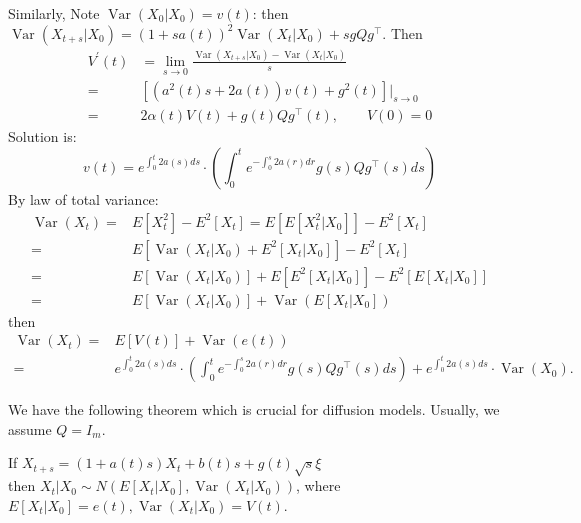 Similarly, Note $\operatorname{Var}\left(X_{0} | X_{0}\right)=v(t)$:
then $\operatorname{Var}\left(X_{t+s} | X_{0}\right)=(1+s a(t))^{2} \operatorname{Var}\left(X_{t} | X_{0}\right)+s gQg^\top$. Then
\begin{equation}
    \begin{aligned}
        V^{\prime}(t)&=\lim _{s \rightarrow 0} \frac{\operatorname{Var}\left(X_{t+s} | X_{0}\right)-\operatorname{Var}\left(X_{t} | X_{0}\right)}{s}\\
        =&\left[\left(a^{2}(t) s+2 a(t)\right) v(t)+g^{2}(t)\right]|_{s \rightarrow 0}\\ 
        =&2 \alpha(t) V(t)+g(t)Qg^\top(t), \qquad V(0)=0
    \end{aligned}
\end{equation}
Solution is:
\begin{equation}
    v(t)=e^{\int_{0}^{t} 2a(s) d s}\cdot\left(\int_{0}^{t} e^{-\int_{0}^{s} 2 a(r) d r} g(s)Qg^\top(s) d s\right)
\end{equation} 
By law of total variance:
\begin{equation}
    \begin{aligned}
        \operatorname{Var}\left(X_{t}\right)=&E\left[X_{t}^{2}\right]-E^{2}\left[X_{t}\right]=E\left[ E\left[X_{t}^{2} | X_{0}\right]\right]-E^{2}\left[X_{t}\right] \\
        =&E\left[\operatorname{Var}\left(X_{t} | X_{0}\right)+E^{2}\left[X_{t} | X_{0}\right]\right]-E^{2}\left[X_{t}\right] \\
        =&E\left[\operatorname{Var}\left(X_{t} | X_{0}\right)\right]+E\left[E^{2}\left[X_{t} | X_0\right]\right]-E^{2}\left[E\left[X_{t} | X_{0}\right]\right]\\
        =&E\left[\operatorname{Var}\left(X_{t} | X_{0}\right)\right]+\operatorname{Var}\left(E\left[X_{t} | X_0\right]\right)
    \end{aligned}
\end{equation}
then 
\begin{equation}
    \begin{aligned}
        \operatorname{Var}(X_t)=&E[V(t)]+\operatorname{Var}(e(t))\\
        =&e^{\int_{0}^{t} 2 a(s) d s}\cdot \left(\int_{0}^{t} e^{-\int_{0}^{s} 2 a(r) d r} g(s)Qg^\top(s) d s\right) +e^{\int_{0}^{t} 2 a(s) d s} \cdot \operatorname{Var}\left(X_{0}\right) .
    \end{aligned}
\end{equation}

We have the following theorem which is crucial for diffusion models. Usually, we assume $Q=I_m$.
\begin{theorem}\label{thm1}
    If  $X_{t+s}=(1+a(t) s) X_{t}+b(t) s+g(t) \sqrt{s} \xi$\\
    then $X_{t} | X_{0} \sim N\left(E\left[X_{t} | X_{0}\right], \operatorname{Var}\left(X_{t} | X_{0}\right)\right)$, 
    where $E\left[X_{t} | X_{0}\right]=e(t), \operatorname{Var}\left(X_{t} | X_{0}\right)=V(t)$.        
\end{theorem}

